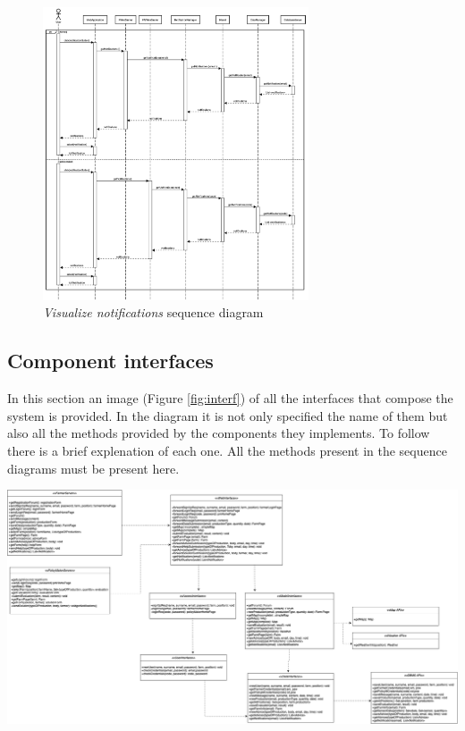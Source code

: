 \begin{enumerate}
\begin{figure}[H]
\begin{center}
        \includegraphics[width=0.7\textwidth]{sequence/viewNotifications.png}
        \caption{\emph{Visualize notifications} sequence diagram}
        \label{fig:sequence9}
        \end{center}
    \end{figure}
    
\end{enumerate}


\subsection{Component interfaces}
In this section an image (Figure \ref{fig:interf}) of all the interfaces that compose the system is provided. In the diagram it is not only specified the name of them but also all the methods provided by the components they implements. To follow there is a brief explenation of each one. All the methods present in the sequence diagrams must be present here. 


\begin{adjustbox}{angle=90,center,caption=\emph{Interfaces} view,nofloat=figure}
    \includegraphics[width=1.6\linewidth]{images/Interfaces.png}
    \label{fig:interf}
\end{adjustbox}


